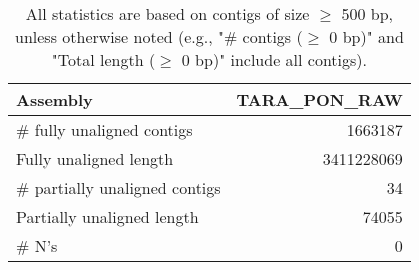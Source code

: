 \documentclass[12pt,a4paper]{article}
\begin{document}
\begin{table}[ht]
\begin{center}
\caption{All statistics are based on contigs of size $\geq$ 500 bp, unless otherwise noted (e.g., "\# contigs ($\geq$ 0 bp)" and "Total length ($\geq$ 0 bp)" include all contigs).}
\begin{tabular}{|l*{1}{|r}|}
\hline
Assembly & TARA\_PON\_RAW \\ \hline
\# fully unaligned contigs & 1663187 \\ \hline
Fully unaligned length & 3411228069 \\ \hline
\# partially unaligned contigs & 34 \\ \hline
Partially unaligned length & 74055 \\ \hline
\# N's & 0 \\ \hline
\end{tabular}
\end{center}
\end{table}
\end{document}
